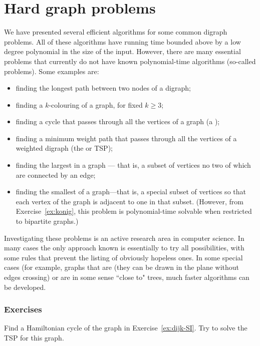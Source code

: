 \chapter{Hard graph problems}%
\label{sec:hardgraph}
We have presented several efficient algorithms for some common digraph
problems. All of these algorithms have running time bounded above by a low
degree polynomial in the size of the input. However, there are many
essential problems that currently do not have known polynomial-time
algorithms (so-called  problems). Some examples
are:
\begin{itemize}
\item finding the longest path between two nodes of
a digraph;
\item finding a $k$-colouring of a graph, for fixed $k\geq
3$;
\item finding a cycle that passes through all the vertices of
a graph (a );
\item finding a
minimum weight path that passes through all the vertices of a weighted
digraph (the  or TSP);
\item finding the largest  in a graph --- that is, 
a subset of vertices no two of which are connected by an edge;
\item finding the smallest 
 of a graph---that is, a special subset of
vertices so that each vertex of the graph is adjacent to one in that
subset. (However, from Exercise~\ref{ex:konig}, this problem 
is polynomial-time solvable when restricted to bipartite graphs.)

\end{itemize}

Investigating these problems is an active research area in computer
science. In many cases the only approach known is essentially to try
all possibilities, with some rules that prevent the listing of obviously
hopeless ones. In some special cases (for example, graphs that are 
 (they can be drawn in the plane without edges crossing) 
or are in some sense ``close to" trees, much faster algorithms can be developed.

\subsection*{Exercises}

\begin{Exercise}\label{exr:tsp}
Find a Hamiltonian cycle of the graph in Exercise~\ref{ex:dijk-SI}. Try to solve
the TSP for this graph.
\end{Exercise}

